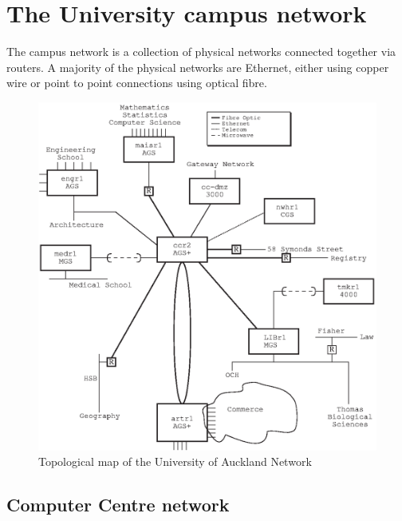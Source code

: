 \section{The University campus network}

The campus network is a collection of physical networks connected
together via routers.  A majority of the physical networks are
Ethernet, either using copper wire or point to point connections using
optical fibre.

\begin{figure}
\includegraphics{pics/uni-network-map.eps}
\caption{Topological map of the University of Auckland Network}
\label{map:uni}
\end{figure}

\subsection{Computer Centre network}

